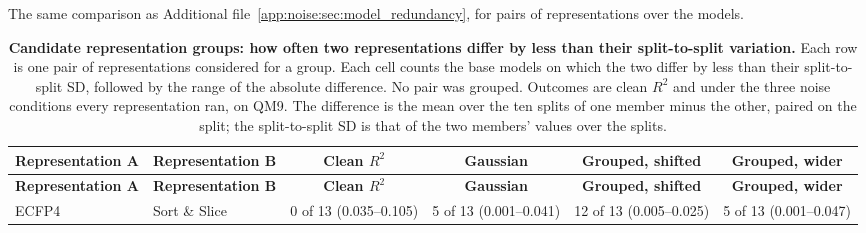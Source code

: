 \begin{landscape}
\label{app:noise:sec:representation_redundancy}
The same comparison as Additional file~\ref{app:noise:sec:model_redundancy}, for pairs of representations over the models.
{\AFtablefont
\begin{longtable}{llcccc}
\caption{\textbf{Candidate representation groups: how often two representations differ by less than their split-to-split variation.}
Each row is one pair of representations considered for a group. Each cell counts the base models on which the two differ by less than their split-to-split SD, followed by the range of the absolute difference. No pair was grouped. Outcomes are clean $R^2$ and \aucnorm{} under the three noise conditions every representation ran, on QM9. The difference is the mean over the ten splits of one member minus the other, paired on the split; the split-to-split SD is that of the two members' values over the splits.}
\label{app:noise:family_pairs_representations}\\
\toprule
\textbf{Representation A} & \textbf{Representation B} & \textbf{Clean $R^2$} & \textbf{Gaussian} & \textbf{Grouped, shifted} & \textbf{Grouped, wider} \\
\midrule
\endfirsthead
\toprule
\textbf{Representation A} & \textbf{Representation B} & \textbf{Clean $R^2$} & \textbf{Gaussian} & \textbf{Grouped, shifted} & \textbf{Grouped, wider} \\
\midrule
\endhead
ECFP4 & Sort \& Slice & 0 of 13 (0.035--0.105) & 5 of 13 (0.001--0.041) & 12 of 13 (0.005--0.025) & 5 of 13 (0.001--0.047) \\
\bottomrule
\end{longtable}}

\end{landscape}

